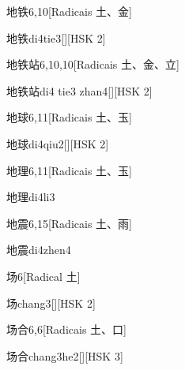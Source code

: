 \begin{entry}{地铁}{6,10}[Radicais ⼟、⾦]
  \begin{phonetics}{地铁}{di4tie3}[][HSK 2]
  \end{phonetics}
\end{entry}

\begin{entry}{地铁站}{6,10,10}[Radicais ⼟、⾦、⽴]
  \begin{phonetics}{地铁站}{di4 tie3 zhan4}[][HSK 2]
  \end{phonetics}
\end{entry}

\begin{entry}{地球}{6,11}[Radicais ⼟、⽟]
  \begin{phonetics}{地球}{di4qiu2}[][HSK 2]
  \end{phonetics}
\end{entry}

\begin{entry}{地理}{6,11}[Radicais ⼟、⽟]
  \begin{phonetics}{地理}{di4li3}
  \end{phonetics}
\end{entry}

\begin{entry}{地震}{6,15}[Radicais ⼟、⾬]
  \begin{phonetics}{地震}{di4zhen4}
  \end{phonetics}
\end{entry}

\begin{entry}{场}{6}[Radical ⼟]
  \begin{phonetics}{场}{chang3}[][HSK 2]
  \end{phonetics}
\end{entry}

\begin{entry}{场合}{6,6}[Radicais ⼟、⼝]
  \begin{phonetics}{场合}{chang3he2}[][HSK 3]
  \end{phonetics}
\end{entry}

